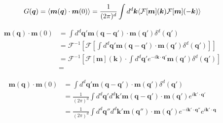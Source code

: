 \documentclass[autodetect-engine,dvipdfmx-if-dvi,ja=standard]{bxjsarticle}
\theoremstyle{break}
\begin{document}
            




                \begin{align}
                    G(\bm{q})=\braket{\bm{m}(\bm{q})\cdot \bm{m}(0)}=\frac{1}{(2\pi)^d}\int d^d \bm{k}\langle\mathcal{F}[\bm{m}](\bm{k})\mathcal{F}[\bm{m}](-\bm{k})\rangle 
                \end{align}

                \begin{align}
                    \bm{m}(\bm{q})\cdot \bm{m}(0)&=\int d^d \bm{q}' \bm{m}(\bm{q}-\bm{q}')\cdot\bm{m}(\bm{q}')\delta^d(\bm{q}')\\
                    &=\mathcal{F}^{-1}\left[\mathcal{F}\left[\int d^d \bm{q}' \bm{m}(\bm{q}-\bm{q}')\cdot\bm{m}(\bm{q}')\delta^d(\bm{q}')\right]\right]\\
                    &=\mathcal{F}^{-1}[\mathcal{F}[\bm{m}](\bm{k})\cdot \int d^d \bm{q}' e^{-i\bm{k}\cdot\bm{q}'}\bm{m}(\bm{q}')\delta^d(\bm{q}')]\\
                    &=
                \end{align}

                \begin{align}
                    \bm{m}(\bm{q})\cdot \bm{m}(0)&=\int d^d \bm{q}' \bm{m}(\bm{q}-\bm{q}')\cdot\bm{m}(\bm{q}')\delta^d(\bm{q}')\\
                    &=\frac{1}{(2\pi)^d}\int d^d \bm{q}' d^d \bm{k}'\bm{m}(\bm{q}-\bm{q}')\cdot\bm{m}(\bm{q}')e^{i\bm{k}'\cdot\bm{q}'}\\
                    &=\frac{1}{(2\pi)^d}\int d^d \bm{q}'' d^d \bm{k}'\bm{m}(\bm{q}'')\cdot\bm{m}(\bm{q}')e^{-i\bm{k}'\cdot\bm{q}''}e^{i\bm{k}'\cdot\bm{q}}
                \end{align}

        \fi

    
            
            

            
\end{document}
